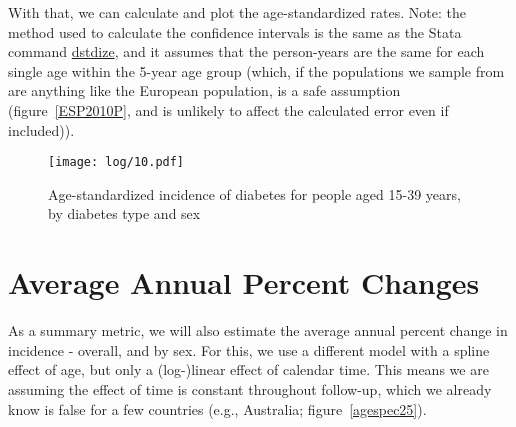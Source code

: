 \documentclass[11pt]{article}
\begin{document}
\clearpage

With that, we can calculate and plot the age-standardized rates.
Note: the method used to calculate the confidence intervals is the 
same as the Stata command \href{https://www.stata.com/manuals/rdstdize.pdf}{dstdize}, and it assumes that the person-years
are the same for each single age within the 5-year age group (which, if the 
populations we sample from are anything like the European population, is 
a safe assumption (figure~\ref{ESP2010P}, and is unlikely to affect the calculated
error even if included)).

\color{Blue4}
\begin{stlog}\end{stlog}
\begin{figure}
    \centering
    \texttt{[image: log/10.pdf]}
    \caption{Age-standardized incidence of diabetes for people aged 15-39 years, by diabetes type and sex}
    \label{STDfig}
\end{figure}
\begin{stlog}\end{stlog}
\color{black}

\clearpage
\section{Average Annual Percent Changes}

As a summary metric, we will also estimate the average annual percent change
in incidence - overall, and by sex. For this, we use a different model with a spline effect
of age, but only a (log-)linear effect of calendar time. This means we are assuming the effect of time
is constant throughout follow-up, which we already know is false for a few countries (e.g., Australia;
figure~\ref{agespec25}). \\

\color{Blue4}
\begin{stlog}\end{stlog}
\color{black}
\end{document}
